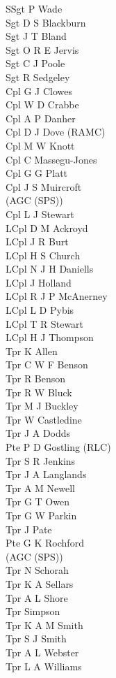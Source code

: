 \begin{multicols}{4}
  \footnotesize
  \noindent
  SSgt P Wade \\
  Sgt D S Blackburn \\
  Sgt J T Bland \\
  Sgt O R E Jervis \\
  Sgt C J Poole \\
  Sgt R Sedgeley \\
  Cpl G J Clowes \\
  Cpl W D Crabbe \\
  Cpl A P Danher \\
  Cpl D J Dove (RAMC) \\
  Cpl M W Knott \\
  Cpl C Massegu-Jones \\
  Cpl G G Platt \\
  Cpl J S Muircroft \\ \indent (AGC (SPS)) \\
  Cpl L J Stewart \\
  LCpl D M Ackroyd \\
  LCpl J R Burt \\
  LCpl H S Church \\
  LCpl N J H Daniells \\
  LCpl J Holland \\
  LCpl R J P McAnerney \\
  LCpl L D Pybis \\
  LCpl T R Stewart \\
  LCpl H J Thompson \\
  Tpr K Allen \\
  Tpr C W F Benson \\
  Tpr R Benson \\
  Tpr R W Bluck \\
  Tpr M J Buckley \\
  Tpr W Castledine \\
  Tpr J A Dodds \\
  Pte P D Gostling (RLC) \\
  Tpr S R Jenkins \\
  Tpr J A Langlands \\
  Tpr A M Newell \\
  Tpr G T Owen \\
  Tpr G W Parkin \\
  Tpr J Pate \\
  Pte G K Rochford \\ \indent (AGC (SPS)) \\
  Tpr N Schorah \\
  Tpr K A Sellars \\
  Tpr A L Shore \\
  Tpr Simpson \\
  Tpr K A M Smith \\
  Tpr S J Smith \\
  Tpr A L Webster \\
  Tpr L A Williams \\
\end{multicols}

